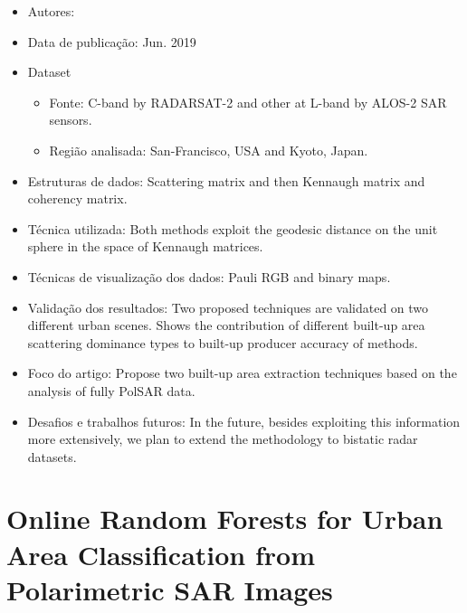 \documentclass[paper=a4, fontsize=11pt]{scrartcl}
\begin{document}
\begin{itemize}
    \item Autores:~\cite{ratha2019novel}
    \item Data de publicação: Jun. 2019
    \item Dataset
    \begin{itemize}
        \item Fonte: C-band by RADARSAT-2 and other at L-band by ALOS-2 SAR sensors. 
        \item Região analisada: San-Francisco, USA and Kyoto, Japan.
    \end{itemize}
    \item Estruturas de dados: Scattering matrix and then Kennaugh matrix and coherency matrix.
    \item Técnica utilizada: Both methods exploit the geodesic distance on the unit sphere in the space of Kennaugh matrices.
    \item Técnicas de visualização dos dados: Pauli RGB and binary maps.
    \item Validação dos resultados: Two proposed techniques are validated on two different urban scenes. Shows the contribution of different built-up area scattering dominance types to built-up producer accuracy of methods.
    \item Foco do artigo: Propose two built-up area extraction techniques based on the analysis of fully PolSAR data.
    \item Desafios e trabalhos futuros: In the future, besides exploiting this information more extensively, we plan to extend the methodology to bistatic radar datasets.
\end{itemize}

\newpage

\section*{Online Random Forests for Urban Area Classification from Polarimetric SAR Images}
\end{document}

